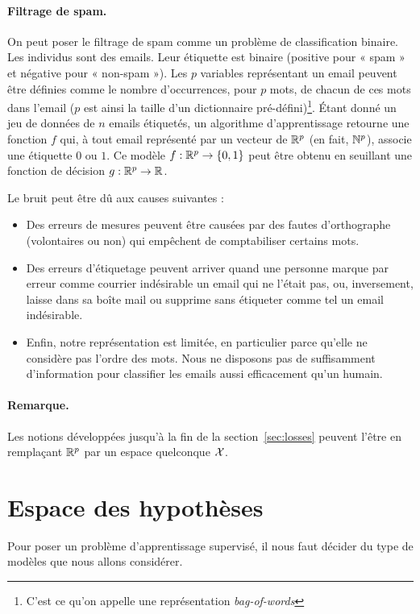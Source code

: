 \begin{exemple}
  \paragraph{Filtrage de spam.} On peut poser le filtrage de spam comme un
  problème de classification binaire. Les individus sont des emails. Leur
  étiquette est binaire (positive pour « spam » et négative pour « non-spam
  »). Les $p$ variables représentant un email peuvent être définies comme le
  nombre d'occurrences, pour $p$ mots, de chacun de ces mots dans l'email ($p$
  est ainsi la taille d'un dictionnaire pré-défini)\footnote{C'est ce qu'on
    appelle une représentation \textit{bag-of-words}}. Étant donné un jeu de
  données de $n$ emails étiquetés, un algorithme d'apprentissage retourne une
  fonction $f$ qui, à tout email représenté par un vecteur de $\mathbb{R}^p$ (en fait,
  $\mathbb{N}^p$), associe une étiquette $0$ ou $1$. Ce modèle
  $f: \mathbb{R}^p \to \lbrace 0, 1 \rbrace$ peut être obtenu en seuillant une fonction de
  décision $g: \mathbb{R}^p \to \mathbb{R}$.

  Le bruit peut être dû aux causes suivantes :
  \begin{itemize}
  \item Des erreurs de mesures peuvent être causées par des fautes
    d'orthographe (volontaires ou non) qui empêchent de comptabiliser certains
    mots.
  \item Des erreurs d'étiquetage peuvent arriver quand une personne marque par
    erreur comme courrier indésirable un email qui ne l'était pas, ou,
    inversement, laisse dans sa boîte mail ou supprime sans étiqueter comme tel
    un email indésirable.
  \item Enfin, notre représentation est limitée, en particulier parce qu'elle
    ne considère pas l'ordre des mots. Nous ne disposons pas de suffisamment
    d'information pour classifier les emails aussi efficacement qu'un humain.
  \end{itemize}
\end{exemple}


\paragraph{Remarque.} Les notions développées jusqu'à la fin de la
section~\ref{sec:losses} peuvent l'être en remplaçant $\mathbb{R}^p$ par un espace
quelconque $\mathcal{X}$.


\section{Espace des hypothèses}
Pour poser un problème d'apprentissage supervisé, il nous faut décider du
type de modèles que nous allons considérer. 

